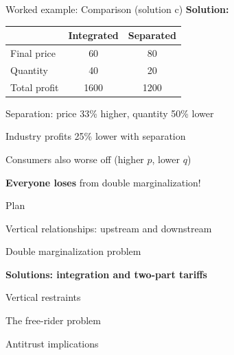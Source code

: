 \documentclass[notes,11pt, aspectratio=169]{beamer}
\newenvironment{wideitemize}{\itemize\addtolength{\itemsep}{10pt}}{\enditemize}
\newenvironment{wideenumerate}{\enumerate\addtolength{\itemsep}{10pt}}{\endenumerate}
\begin{document}
\begin{frame}{Worked example: Comparison (solution c)}
	\textbf{Solution:}
	\begin{center}
		\begin{tabular}{|l|c|c|}
			\hline
			& \textbf{Integrated} & \textbf{Separated} \\
			\hline
			Final price & 60 & 80 \\
			Quantity & 40 & 20 \\
			Total profit & 1600 & 1200 \\
			\hline
		\end{tabular}
	\end{center}
	\vspace{10pt}
	\begin{wideitemize}
		\item Separation: price 33\% higher, quantity 50\% lower
		\item Industry profits 25\% lower with separation
		\item Consumers also worse off (higher $p$, lower $q$)
		\item \textbf{Everyone loses} from double marginalization!
	\end{wideitemize}
\end{frame}

\begin{frame}{Plan}
  \begin{wideenumerate}
    \item Vertical relationships: upstream and downstream
    \item Double marginalization problem
    \item \textbf{Solutions: integration and two-part tariffs}
    \item Vertical restraints
    \item The free-rider problem
    \item Antitrust implications
  \end{wideenumerate}
\end{frame}
\end{document}

